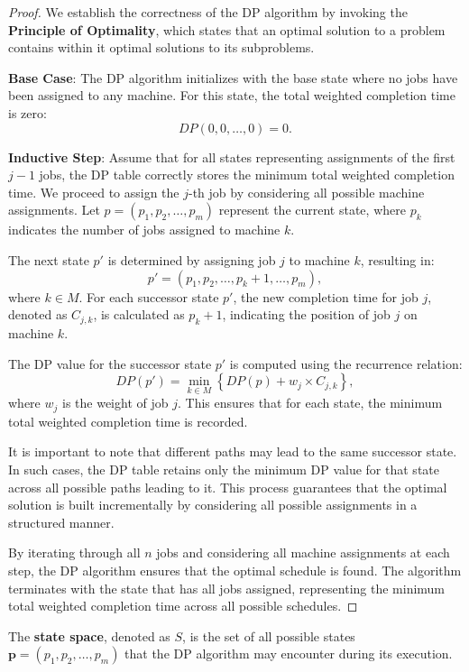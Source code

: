 \begin{proof}
    We establish the correctness of the DP algorithm by invoking the \textbf{Principle of Optimality}, which states that an optimal solution to a problem contains within it optimal solutions to its subproblems.

    \textbf{Base Case}: The DP algorithm initializes with the base state where no jobs have been assigned to any machine. For this state, the total weighted completion time is zero:
    \[
        DP(0, 0, \dots, 0) = 0.
    \]

    \textbf{Inductive Step}: Assume that for all states representing assignments of the first $j-1$ jobs, the DP table correctly stores the minimum total weighted completion time. We proceed to assign the $j$-th job by considering all possible machine assignments. Let $p = (p_1, p_2, \dots, p_m)$ represent the current state, where $p_k$ indicates the number of jobs assigned to machine $k$.

    The next state $p'$ is determined by assigning job $j$ to machine $k$, resulting in:
    \[
        p' = (p_1, p_2, \dots, p_k + 1, \dots, p_m),
    \]
    where $k \in M$. For each successor state $p'$, the new completion time for job $j$, denoted as $C_{j,k}$, is calculated as $p_k + 1$, indicating the position of job $j$ on machine $k$.

    The DP value for the successor state $p'$ is computed using the recurrence relation:
    \[
        DP(p') = \min_{k \in M} \left\{ DP(p) + w_j \times C_{j,k} \right\},
    \]
    where $w_j$ is the weight of job $j$. This ensures that for each state, the minimum total weighted completion time is recorded.

    It is important to note that different paths may lead to the same successor state. In such cases, the DP table retains only the minimum DP value for that state across all possible paths leading to it. This process guarantees that the optimal solution is built incrementally by considering all possible assignments in a structured manner.

    By iterating through all $n$ jobs and considering all machine assignments at each step, the DP algorithm ensures that the optimal schedule is found. The algorithm terminates with the state that has all jobs assigned, representing the minimum total weighted completion time across all possible schedules.
\end{proof}

\begin{definition}
    \label{def:state-space}
    The \textbf{state space}, denoted as $S$, is the set of all possible states $\boldsymbol{p} = (p_1, p_2, \dots, p_m)$ that the DP algorithm may encounter during its execution.
\end{definition}

